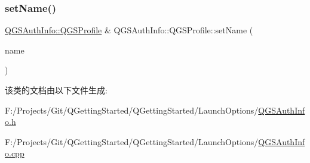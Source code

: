 \subsubsection{\texorpdfstring{set\+Name()}{setName()}}
{\footnotesize\ttfamily \mbox{\hyperlink{class_q_g_s_auth_info_1_1_q_g_s_profile}{Q\+G\+S\+Auth\+Info\+::\+Q\+G\+S\+Profile}} \& Q\+G\+S\+Auth\+Info\+::\+Q\+G\+S\+Profile\+::set\+Name (\begin{DoxyParamCaption}\item[{const Q\+String \&}]{name }\end{DoxyParamCaption})}



该类的文档由以下文件生成\+:\begin{DoxyCompactItemize}
\item 
F\+:/\+Projects/\+Git/\+Q\+Getting\+Started/\+Q\+Getting\+Started/\+Launch\+Options/\mbox{\hyperlink{_q_g_s_auth_info_8h}{Q\+G\+S\+Auth\+Info.\+h}}\item 
F\+:/\+Projects/\+Git/\+Q\+Getting\+Started/\+Q\+Getting\+Started/\+Launch\+Options/\mbox{\hyperlink{_q_g_s_auth_info_8cpp}{Q\+G\+S\+Auth\+Info.\+cpp}}\end{DoxyCompactItemize}
